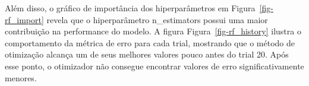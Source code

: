 \documentclass[
  12pt,
  a4paper,
]{scrreprt}
\begin{document}
\vspace{12pt}

Além disso, o gráfico de importância dos hiperparâmetros em
Figura~\ref{fig-rf_import} revela que o hiperparâmetro n\_estimators
possui uma maior contribuição na performance do modelo. A figura
Figura~\ref{fig-rf_history} ilustra o comportamento da métrica de erro
para cada trial, mostrando que o método de otimização alcança um de seus
melhores valores pouco antes do trial 20. Após esse ponto, o otimizador
não consegue encontrar valores de erro significativamente menores.

\begin{figure}

\begin{minipage}{0.50\linewidth}


\subcaption{\label{fig-rf_slice}}

\end{minipage}%
%
\begin{minipage}{0.50\linewidth}

\end{minipage}
\end{figure}
\end{document}

